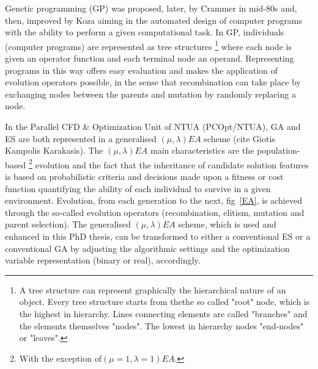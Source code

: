 Genetic programming (GP) was proposed, later, by Crammer in mid-80s \cite{cramer85} and, then, improved by Koza \cite{Koz94} aiming in the automated design of computer programs with the ability to perform a given computational task. In GP, individuals (computer programs) are represented as tree structures \footnote{A tree structure can represent graphically the hierarchical nature of an object. Every tree structure starts from thethe so called "root" node, which is the highest in hierarchy. Lines connecting elements are called "branches" and the elements themselves "nodes". The lowest in hierarchy nodes  "end-nodes" or "leaves". } where each node is given an operator function and each terminal node an operand. Representing programs in this way offers easy evaluation and makes the application of evolution operators possible, in the sense that recombination can take place by exchanging nodes between the parents and mutation by randomly replacing a node. 

In the Parallel CFD \& Optimization Unit of NTUA (PCOpt/NTUA), GA and ES are both represented in a generalised $(\mu,\lambda)EA$ scheme (cite Giotis Kampolis Karakasis).  The $(\mu,\lambda)EA$ main characteristics are the population-based \footnote{With the exception of$(\mu=1,\lambda=1)EA$.} evolution and the fact that the inheritance of candidate solution features is based on probabilistic criteria and decisions made upon a fitness or cost function quantifying the ability of each individual to survive in a given environment. Evolution, from each generation to the next, fig~\ref{EA}, is achieved through the so-called evolution operators (recombination, elitism, mutation and parent selection). The generalised $(\mu,\lambda)EA$ scheme, which is used and enhanced in this PhD thesis, can be transformed to either a conventional ES or a conventional GA by adjusting the algorithmic settings and the optimization variable representation (binary or real), accordingly.  

